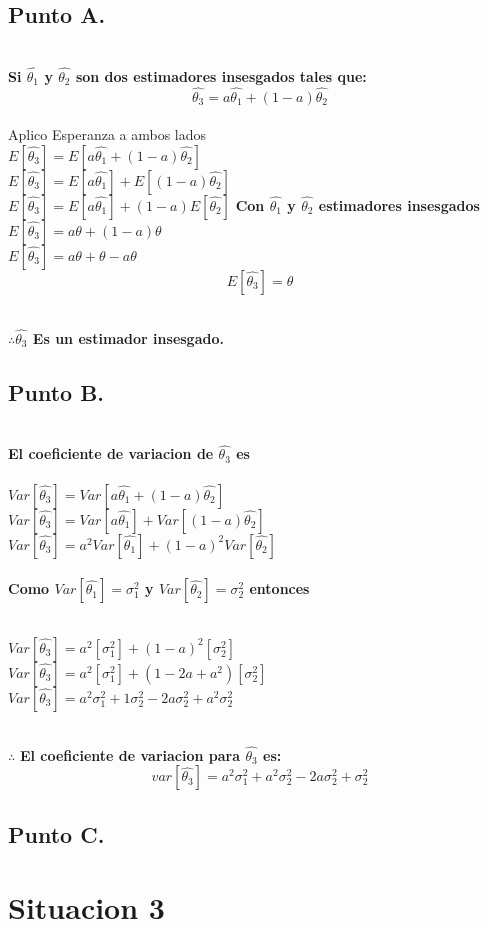 \documentclass[letterpaper,12pt,onecolumn,titlepage]{article}
\begin{document}
\subsection{Punto A.}
~\\\textbf{Si $\hat{\theta_1}$ y $\hat{\theta_2}$ son dos estimadores insesgados tales que:
~\\$$\hat{\theta_3}=a{\hat{\theta_1}}+(1-a){\hat{\theta_2}}$$}
~\\ Aplico Esperanza a ambos lados 
~\\ $E[\hat{\theta_3}] = E[a{\hat{\theta_1}}+(1-a){\hat{\theta_2}}]$
~\\ $E[\hat{\theta_3}] = E[a{\hat{\theta_1}}]+E[(1-a){\hat{\theta_2}}]$
~\\ $E[\hat{\theta_3}] = E[a{\hat{\theta_1}}]+(1-a)E[{\hat{\theta_2}}]$ \textbf{Con $\hat{\theta_1}$ y $\hat{\theta_2}$ estimadores insesgados}\
~\\ $E[\hat{\theta_3}] = a{\theta} + (1-a){\theta}$
~\\ $E[\hat{\theta_3}] = a{\theta} + {\theta} - a{\theta}$
~\\ $$E[\hat{\theta_3}]={\theta}$$

~\\\textbf{$\therefore \hat{\theta_3}$ Es un estimador insesgado.} 
 


\subsection{Punto B.} 

~\\\textbf{ El coeficiente de variacion de $\hat{\theta_3}$ es}
~\\
~\\ $Var[\hat{\theta_3}]=Var[a{\hat{\theta_1}}+(1-a){\hat{\theta_2}}]$
~\\ $Var[\hat{\theta_3}]=Var[a{\hat{\theta_1}}]+Var[(1-a){\hat{\theta_2}}]$
~\\ $Var[\hat{\theta_3}]=a^2Var[{\hat{\theta_1}}]+(1-a)^2Var[{\hat{\theta_2}}]$
~\\
~\\\textbf{Como $Var[{\hat{\theta_1}}]=\sigma_1^2$ y $Var[{\hat{\theta_2}}]=\sigma_2^2$ entonces}

~\\ $Var[\hat{\theta_3}]=a^2[\sigma_1^2]+(1-a)^2[\sigma_2^2]$
~\\ $Var[\hat{\theta_3}]=a^2[\sigma_1^2]+(1-2a+a^2)[\sigma_2^2]$
~\\ $Var[\hat{\theta_3}]=a^2\sigma_1^2+1\sigma_2^2-2a\sigma_2^2+a^2\sigma_2^2$

~\\$\therefore$ \textbf{El coeficiente de variacion para $\hat{\theta_3}$ es:}  
$$var[\hat{\theta_3}]=a^2\sigma_1^2+a^2\sigma_2^2-2a\sigma_2^2+\sigma_2^2$$


\subsection{Punto C.} 


\section{Situacion 3}



\end{document}

